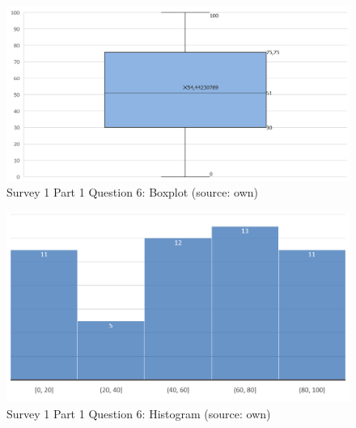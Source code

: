 \documentclass[a4paper,10pt,twoside]{article}
\begin{document}
\vspace{0.3cm}
\begin{figure}[hbt!] 
\begin{center}
\includegraphics[width=13cm]{../surveys/analyzed_data/survey1_part1_question6_boxplot.png} 
\caption[Survey 1 Part 1 Question 6: Boxplot]{Survey 1 Part 1 Question 6: Boxplot (source: own)}
\label{fig:survey1_part1_question6_boxplot}
\end{center}
\end{figure}

\vspace{0.3cm}
\begin{figure}[hbt!] 
\begin{center}
\includegraphics[width=14cm]{../surveys/analyzed_data/survey1_part1_question6_histogram.png} 
\caption[Survey 1 Part 1 Question 6: Histogram]{Survey 1 Part 1 Question 6: Histogram (source: own)}
\label{fig:survey1_part1_question6_histogram}
\end{center}
\end{figure}
\end{document}
